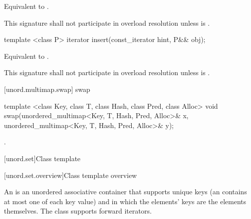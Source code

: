 \begin{itemdescr}
\pnum
\effects Equivalent to . 

\pnum
\remarks This signature shall not participate in overload resolution
unless  is .
\end{itemdescr}

%
%
\begin{itemdecl}
template <class P>
  iterator insert(const_iterator hint, P&& obj);
\end{itemdecl}

\begin{itemdescr}
\pnum
\effects Equivalent to 
.

\pnum
\remarks This signature shall not participate in overload resolution
unless  is .
\end{itemdescr}

[unord.multimap.swap]{ swap}

%
%
\begin{itemdecl}
template <class Key, class T, class Hash, class Pred, class Alloc>
  void swap(unordered_multimap<Key, T, Hash, Pred, Alloc>& x,
            unordered_multimap<Key, T, Hash, Pred, Alloc>& y);
\end{itemdecl}


\begin{itemdescr}
\pnum\effects {}.
\end{itemdescr}

[unord.set]{Class template }%

[unord.set.overview]{Class template  overview}

\pnum
{}%
%
An  is an unordered associative container that
supports unique keys (an  contains at most one of each
key value) and in which the elements' keys are the elements
themselves.
The  class
supports forward iterators.

